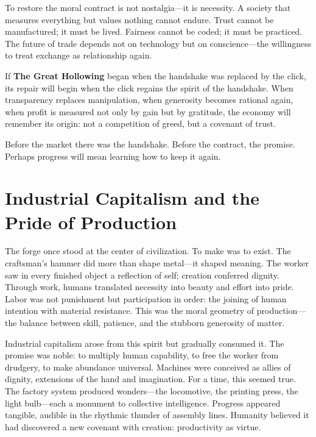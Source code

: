 \documentclass[11pt,twoside]{book}
\begin{document}
To restore the moral contract is not nostalgia—it is necessity.  A society that measures everything but values nothing cannot endure.  Trust cannot be manufactured; it must be lived.  Fairness cannot be coded; it must be practiced.  The future of trade depends not on technology but on conscience—the willingness to treat exchange as relationship again.

If \textbf{The Great Hollowing} began when the handshake was replaced by the click, its repair will begin when the click regains the spirit of the handshake.  When transparency replaces manipulation, when generosity becomes rational again, when profit is measured not only by gain but by gratitude, the economy will remember its origin: not a competition of greed, but a covenant of trust.

Before the market there was the handshake.  
Before the contract, the promise.  
Perhaps progress will mean learning how to keep it again.

\chapter{Industrial Capitalism and the Pride of Production}
\label{ch:12}

The forge once stood at the center of civilization.  
To make was to exist.  The craftsman’s hammer did more than shape metal—it shaped meaning.  The worker saw in every finished object a reflection of self; creation conferred dignity.  Through work, humans translated necessity into beauty and effort into pride.  Labor was not punishment but participation in order: the joining of human intention with material resistance.  This was the moral geometry of production—the balance between skill, patience, and the stubborn generosity of matter.

Industrial capitalism arose from this spirit but gradually consumed it.  The promise was noble: to multiply human capability, to free the worker from drudgery, to make abundance universal.  Machines were conceived as allies of dignity, extensions of the hand and imagination.  For a time, this seemed true.  The factory system produced wonders—the locomotive, the printing press, the light bulb—each a monument to collective intelligence.  Progress appeared tangible, audible in the rhythmic thunder of assembly lines.  Humanity believed it had discovered a new covenant with creation: productivity as virtue.
\end{document}
